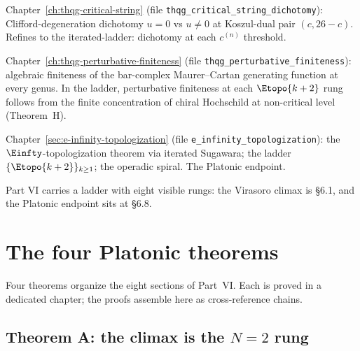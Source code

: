 \begin{description}
 Chapter~\ref{ch:thqg-critical-string} (file
 \texttt{thqg\_critical\_string\_dichotomy}): Clifford-degeneration
 dichotomy $u=0$ vs $u \ne 0$ at Koszul-dual pair $(c, 26-c)$.
 Refines to the iterated-ladder: dichotomy at each $c^{(n)}$ threshold.
 \item[\S6.7 Perturbative Finiteness.]
 Chapter~\ref{ch:thqg-perturbative-finiteness} (file
 \texttt{thqg\_perturbative\_finiteness}): algebraic finiteness of the
 bar-complex Maurer--Cartan generating function at every genus. In the
 ladder, perturbative finiteness at each $\Etopo{k+2}$ rung follows from
 the finite concentration of chiral Hochschild at non-critical level
 (Theorem~H).
 \item[\S6.8 The Platonic Endpoint.]
 \label{sec:part-vi-6-8}
 Chapter~\ref{sec:e-infinity-topologization} (file
 \texttt{e\_infinity\_topologization}): the $\Einfty$-topologization
 theorem via iterated Sugawara; the ladder $\{\Etopo{k+2}\}_{k \ge 1}$;
 the operadic spiral. The Platonic endpoint.
\end{description}

Part VI carries a ladder with eight visible rungs: the Virasoro
climax is \S6.1, and the Platonic endpoint sits at \S6.8.

\section{The four Platonic theorems}
\label{sec:part-vi-four-theorems}

Four theorems organize the eight sections of Part~VI.
Each is proved in a dedicated chapter; the proofs assemble here as
cross-reference chains.

\subsection{Theorem A: the climax is the $N=2$ rung}
\label{sec:part-vi-theorem-A}

